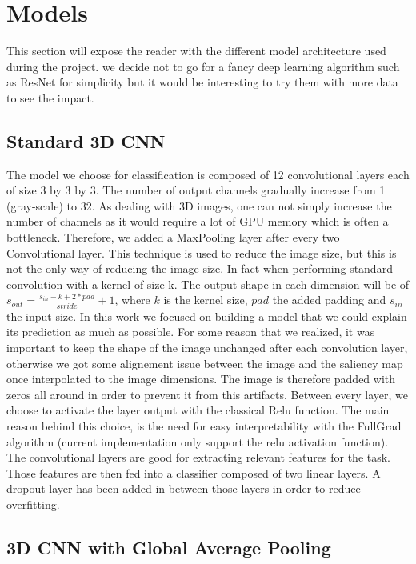 \chapter{Models}
\label{chap:models}
This section will expose the reader with the different model architecture used during the project. we decide not to go for a fancy deep learning algorithm such as ResNet\cite{resNet_he2015deep} for simplicity but it would be interesting to try them with more data to see the impact.

\section{Standard 3D CNN}
\label{sec:standard_cnn}

The model we choose for classification is composed of 12 convolutional layers each of size 3 by 3 by 3. The number of output channels gradually increase from 1 (gray-scale) to 32. As dealing with 3D images, one can not simply increase the number of channels as it would require a lot of GPU memory which is often a bottleneck. Therefore, we added a MaxPooling layer after every two Convolutional layer. This technique is used to reduce the image size, but this is not the only way of reducing the image size. In fact when performing standard convolution with a kernel of size k. The output shape in each dimension will be of $s_{out} = \frac{s_{in} - k + 2* pad}{stride} + 1$, where $k$ is the kernel size, $pad$ the added padding and $s_{in}$ the input size. In this work we focused on building a model that we could explain its prediction as much as possible. For some reason that we realized, it was important to keep the shape of the image unchanged after each convolution layer, otherwise we got some alignement issue between the image and the saliency map once interpolated to the image dimensions. The image is therefore padded with zeros all around in order to prevent it from this artifacts. Between every layer, we choose to activate the layer output with the classical Relu\cite{relu_10.5555/3104322.3104425} function. The main reason behind this choice, is the need for easy interpretability with the FullGrad algorithm (current implementation only support the relu activation function).  
The convolutional layers are good for extracting relevant features for the task. Those features are then fed into a classifier composed of two linear layers. A dropout\cite{dropout_10.5555/2627435.2670313} layer has been added in between those layers in order to reduce overfitting.

\section{3D CNN with Global Average Pooling}

